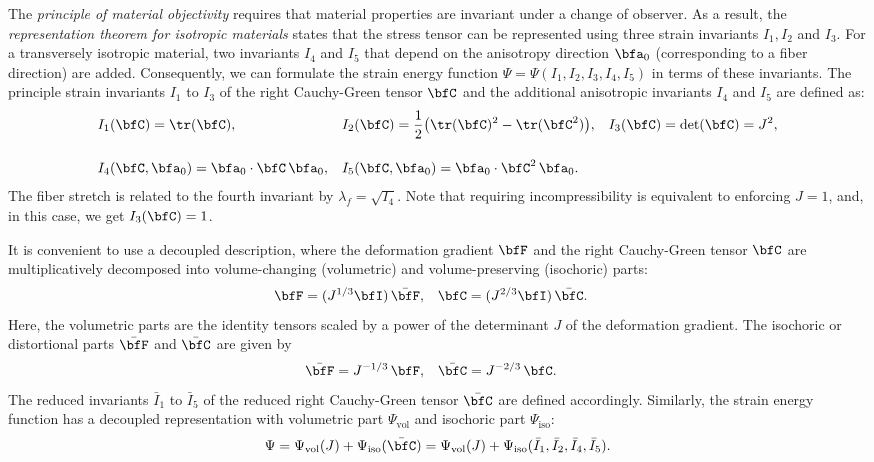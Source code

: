 The \emph{principle of material objectivity} requires that material properties are invariant under a change of observer. As a result, the \emph{representation theorem for isotropic materials} states that the stress tensor can be represented using three strain invariants $I_1, I_2$ and $I_3$. For a transversely isotropic material, two invariants $I_4$ and $I_5$ that depend on the anisotropy direction $\bfa_0$ (corresponding to a fiber direction) are added.
Consequently, we can formulate the strain energy function $\Psi=\Psi(I_1,I_2,I_3,I_4,I_5)$ in terms of these invariants. The principle strain invariants $I_1$ to $I_3$ of the right Cauchy-Green tensor $\bfC$ and the additional anisotropic invariants $I_4$ and $I_5$ are defined as:
\begin{align*}
  &I_1(\bfC) = \tr(\bfC),  &
  &I_2(\bfC) = \dfrac12\big(\tr(\bfC)^2 - \tr(\bfC^2)\big), &
  I_3(\bfC) = \det(\bfC) = J^2,\\[4mm]
  &I_4(\bfC,\bfa_0) = \bfa_0 \cdot \bfC \, \bfa_0, &
  &I_5(\bfC,\bfa_0) = \bfa_0 \cdot \bfC^2 \, \bfa_0. &
\end{align*}
The fiber stretch is related to the fourth invariant by $\lambda_f = \sqrt{I_4}$. Note that requiring incompressibility is equivalent to enforcing $J=1$, and, in this case, we get ${I_3(\bfC) = 1}$. 

It is convenient to use a decoupled description, where the deformation gradient $\bfF$ and the right Cauchy-Green tensor $\bfC$ are multiplicatively decomposed into volume-changing (volumetric) and volume-preserving (isochoric) parts:%
\begin{align*}
  \bfF &= (J^{1/3}\bfI)\,\bar{\bfF},  & \bfC &= (J^{2/3}\bfI)\,\bar{\bfC}.
\end{align*}
%
Here, the volumetric parts are the identity tensors scaled by a power of the determinant $J$ of the deformation gradient. The isochoric or distortional parts $\bar{\bfF}$ and $\bar{\bfC}$ are given by%
\begin{align}\label{eq:reduced_fc}
  \bar{\bfF} &= J^{-1/3}\,\bfF,  & \bar\bfC &= J^{-2/3}\,\bfC.
\end{align}
The reduced invariants $\bar{I}_1$ to $\bar{I}_5$ of the reduced right Cauchy-Green tensor $\bar\bfC$ are defined accordingly.
Similarly, the strain energy function has a decoupled representation with volumetric part $\Psi_\text{vol}$ and isochoric part $\Psi_\text{iso}$:
\begin{align}\label{eq:psi_iso}
  \Psi = \Psi_\text{vol}(J) + \Psi_\text{iso}(\bar{\bfC}) = \Psi_\text{vol}(J) + \Psi_\text{iso}(\bar{I}_1,\bar{I}_2,\bar{I}_4,\bar{I}_5).
\end{align}


